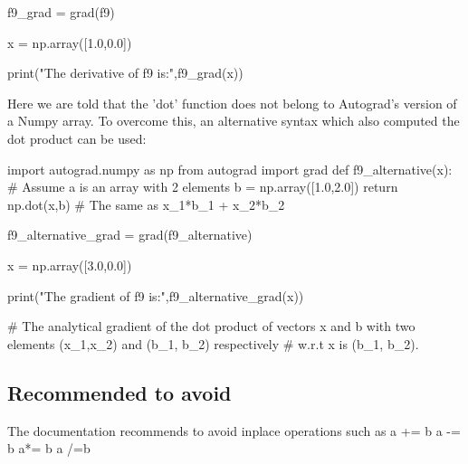 \documentclass[%
oneside,                 %
final,                   %
10pt]{article}
\begin{document}
f9_grad = grad(f9)

x = np.array([1.0,0.0])

print("The derivative of f9 is:",f9_grad(x))
\epycod

Here we are told that the 'dot' function does not belong to Autograd's
version of a Numpy array.  To overcome this, an alternative syntax
which also computed the dot product can be used:

\bpycod
import autograd.numpy as np
from autograd import grad
def f9_alternative(x): # Assume a is an array with 2 elements
    b = np.array([1.0,2.0])
    return np.dot(x,b) # The same as x_1*b_1 + x_2*b_2

f9_alternative_grad = grad(f9_alternative)

x = np.array([3.0,0.0])

print("The gradient of f9 is:",f9_alternative_grad(x))

# The analytical gradient of the dot product of vectors x and b with two elements (x_1,x_2) and (b_1, b_2) respectively
# w.r.t x is (b_1, b_2).
\epycod

\subsection{Recommended to avoid}
The documentation recommends to avoid inplace operations such as
\bpycod
a += b
a -= b
a*= b
a /=b
\epycod





\end{document}
